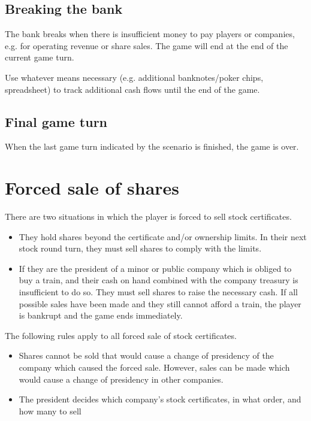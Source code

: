 \documentclass{article}
\begin{document}
\begin{CJK}{UTF8}{min}
\begin{multicols}{2}
\subsection{Breaking the bank}

The bank breaks when there is insufficient money to pay players or
companies, e.g. for operating revenue or share sales. The game will
end at the end of the current game turn.

Use whatever means necessary (e.g. additional banknotes/poker chips,
spreadsheet) to track additional cash flows until the end of the game.

\subsection{Final game turn}

When the last game turn indicated by the scenario is finished, the game is over.


\section{Forced sale of shares}

There are two situations in which the player is forced to sell stock
certificates.
\begin{itemize}
\item They hold shares beyond the certificate and/or ownership
  limits. In their next stock round turn, they must sell shares to
  comply with the limits.

\item If they are the president of a minor or public company which is
  obliged to buy a train, and their cash on hand combined with the
  company treasury is insufficient to do so. They must sell shares to
  raise the necessary cash. If all possible sales have been made and
  they still cannot afford a train, the player is bankrupt and the
  game ends immediately.
\end{itemize}

The following rules apply to all forced sale of stock certificates.
\begin{itemize}
\item Shares cannot be sold that would cause a change of presidency of
  the company which caused the forced sale. However, sales can be made
  which would cause a change of presidency in other companies.

\item The president decides which company's stock certificates, in
  what order, and how many to sell


\end{itemize}
\end{multicols}
\end{CJK}
\end{document}
